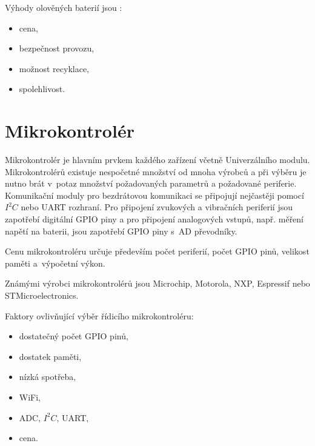 Výhody olověných baterií jsou \cite{olovene}:
\begin{itemize}
  \item cena,
  \item bezpečnost provozu,
  \item možnost recyklace,
  \item spolehlivost. 
\end{itemize}
 
\section{Mikrokontrolér}
Mikrokontrolér je hlavním prvkem každého zařízení včetně Univerzálního modulu. Mikrokontrolérů existuje nespočetné množství od mnoha výrobců a při výběru je nutno brát v~potaz
množství požadovaných parametrů a požadované periferie. 
Komunikační moduly pro bezdrátovou komunikaci se připojují nejčastěji pomocí $I^2C$ nebo UART rozhraní. Pro připojení zvukových a vibračních periferií jsou zapotřebí 
digitální GPIO piny a pro připojení analogových vstupů, např. měření napětí na baterii, jsou zapotřebí GPIO piny s~AD převodníky. 

Cenu mikrokontroléru určuje především počet periferií, počet GPIO pinů, velikost paměti a~výpočetní výkon.

Známými výrobci mikrokontrolérů jsou Microchip, Motorola, NXP, Espressif nebo \\STMicroelectronics. 

Faktory ovlivňující výběr řídicího mikrokontroléru:
\begin{itemize}
  \item dostatečný počet GPIO pinů,
  \item dostatek paměti,
  \item nízká spotřeba,
  \item WiFi,
  \item ADC, $I^2C$, UART,
  \item cena.
\end{itemize}








